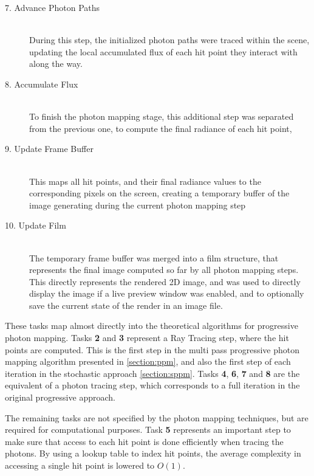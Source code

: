 \documentclass[main.tex]{subfiles}
\begin{document}
\begin{description}
\item[7. Advance Photon Paths] \hfill \\
  During this step, the initialized photon paths were traced within the scene, updating the local accumulated flux of each hit point they interact with along the way.

\item[8. Accumulate Flux] \hfill \\
  To finish the photon mapping stage, this additional step was separated from the previous one, to compute the final radiance of each hit point,

\item[9. Update Frame Buffer] \hfill \\
  This maps all hit points, and their final radiance values to the corresponding pixels on the screen, creating a temporary buffer of the image generating during the current photon mapping step

\item[10. Update Film] \hfill \\
  The temporary frame buffer was merged into a film structure, that represents the final image computed so far by all photon mapping steps. This directly represents the rendered 2D image, and was used to directly display the image if a live preview window was enabled, and to optionally save the current state of the render in an image file.

\end{description}

These tasks map almost directly into the theoretical algorithms for progressive photon mapping. Tasks \textbf{2} and \textbf{3} represent a Ray Tracing step, where the hit points are computed. This is the first step in the multi pass progressive photon mapping algorithm presented in \cref{section:ppm}, and also the first step of each iteration in the stochastic approach \cref{section:sppm}. Tasks \textbf{4}, \textbf{6}, \textbf{7} and \textbf{8} are the equivalent of a photon tracing step, which corresponds to a full iteration in the original progressive approach.

The remaining tasks are not specified by the photon mapping techniques, but are required for computational purposes. Task \textbf{5} represents an important step to make sure that access to each hit point is done efficiently when tracing the photons. By using a lookup table to index hit points, the average complexity in accessing a single hit point is lowered to $O(1)$.
\end{document}

